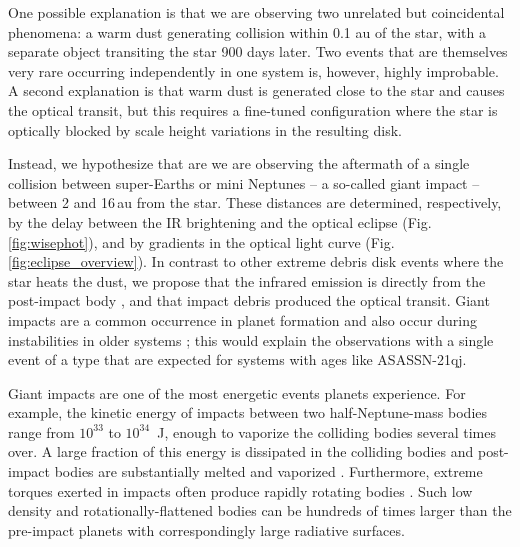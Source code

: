 \documentclass[sn-nature]{sn-jnl}%
\newcommand{\asas}{ASASSN-21qj}
\begin{document}

One possible explanation is that we are observing two unrelated but coincidental phenomena: a warm dust generating collision within 0.1 au of the star, with a separate object transiting the star 900 days later.
%
Two events that are themselves very rare occurring independently in one system is, however, highly improbable.
%
A second explanation is that warm dust is generated close to the star and causes the optical transit, but this requires a fine-tuned configuration where the star is optically blocked by scale height variations in the resulting disk.

Instead, we hypothesize that are we are observing the aftermath of a single collision between super-Earths or mini Neptunes -- a so-called giant impact -- between 2 and 16\,au from the star. 
%
These distances are determined, respectively, by the delay between the IR brightening and the optical eclipse (Fig. \ref{fig:wisephot}), and by gradients in the optical light curve (Fig. \ref{fig:eclipse_overview}).
%
In contrast to other extreme debris disk events where the star heats the dust, we propose that the infrared emission is directly from the post-impact body \cite{Lock2017,2009ApJ...704..770M}, and that impact debris produced the optical transit.
%
Giant impacts are a common occurrence in planet formation \cite{Schlichting2018a,DAngelo2018} and also occur during instabilities in older systems \cite{Kaib2016}; this would explain the observations with a single event of a type that are expected for systems with ages like \asas{}.

Giant impacts are one of the most energetic events planets experience.
%
For example, the kinetic energy of impacts between two half-Neptune-mass bodies range from $10^{33}$ to $10^{34}$~J, enough to vaporize the colliding bodies several times over.
%
A large fraction of this energy is dissipated in the colliding bodies and post-impact bodies are substantially melted and vaporized \cite{Nakajima2015,Lock2017,Carter2020}.
%
Furthermore, extreme torques exerted in impacts often produce rapidly rotating bodies \cite{Lock2017}.
%
Such low density and rotationally-flattened bodies can be hundreds of times larger than the pre-impact planets \cite{Lock2017} with correspondingly large radiative surfaces.

\end{document}

